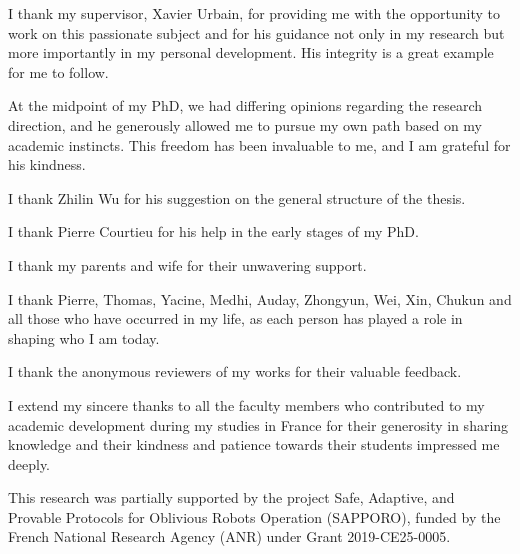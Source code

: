

I thank my supervisor, Xavier Urbain, for providing me with the opportunity to work on this passionate subject and for
 his guidance not only in my research but more importantly in my personal development. 
His integrity is a great example for me to follow.

 At the midpoint of my PhD, we had differing opinions  regarding the research direction, and he generously allowed me to pursue my own path based on my academic instincts. This freedom has been invaluable to me, and I am grateful for his kindness.


I thank Zhilin Wu for his suggestion on the general structure of the thesis.

I thank Pierre Courtieu for his help in the early stages of my PhD.

I thank my parents and wife for their unwavering support. 

I thank Pierre, Thomas, Yacine, Medhi, Auday, Zhongyun, Wei, Xin, Chukun and all those who have occurred in my life, as each person has played a role in shaping who I am today.

I thank the anonymous reviewers of my works for their valuable feedback. 

I extend my sincere thanks to all the faculty members who contributed to my academic development during my studies in France for their generosity in sharing knowledge and their kindness and patience towards their students impressed me deeply.

This research was partially supported by the project Safe, Adaptive, and Provable Protocols for Oblivious Robots Operation (SAPPORO), funded by the French National Research Agency (ANR) under Grant 2019-CE25-0005.
